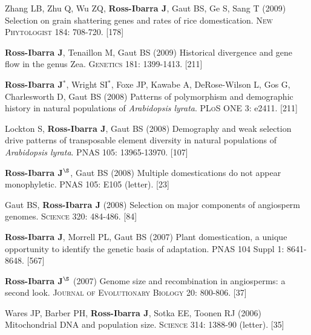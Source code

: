 \documentclass[letterpaper,10pt]{article}
\begin{document}
\begin{etaremune}
\item Zhang LB, Zhu Q, Wu ZQ, {\bf Ross-Ibarra J}, Gaut BS, Ge S, Sang T (2009) Selection on grain shattering genes and rates of rice domestication.  \textsc{New Phytologist} 184: 708-720.
 [178]\\

\item {\bf Ross-Ibarra J}, Tenaillon M, Gaut BS (2009) Historical divergence and gene flow in the genus Zea.  \textsc{Genetics} 181: 1399-1413.
 [211]\\


\item {\bf Ross-Ibarra J}$^*$, Wright SI$^*$, Foxe JP, Kawabe A, DeRose-Wilson L, Gos G, Charlesworth D, Gaut BS (2008) Patterns of polymorphism and demographic history in natural populations of \emph{Arabidopsis lyrata}.  \textsc{PLoS ONE} 3: e2411.
 [211]\\


\item Lockton S, {\bf Ross-Ibarra J}, Gaut BS (2008) Demography and weak selection drive patterns of transposable element diversity in natural populations of \emph{Arabidopsis lyrata}. PNAS 105: 13965-13970.
 [107]\\


\item {\bf Ross-Ibarra J}$^\S$, Gaut BS (2008) Multiple domestications do not appear monophyletic. PNAS 105: E105 (letter).
 [23]\\


\item Gaut BS, {\bf Ross-Ibarra J} (2008) Selection on major components of angiosperm genomes.  \textsc{Science} 320: 484-486.
 [84]\\


\item {\bf Ross-Ibarra J}, Morrell PL, Gaut BS (2007) Plant domestication, a unique opportunity to identify the genetic basis of adaptation. PNAS 104 Suppl 1: 8641-8648.
 [567]\\


\item {\bf Ross-Ibarra J}$^\S$ (2007) Genome size and recombination in angiosperms: a second look.  \textsc{Journal of Evolutionary Biology} 20: 800-806.
 [37]\\


\item Wares JP, Barber PH, {\bf Ross-Ibarra J}, Sotka EE, Toonen RJ (2006) Mitochondrial DNA and population size.  \textsc{Science} 314: 1388-90 (letter).
 [35]\\



\end{etaremune}
\end{document}
